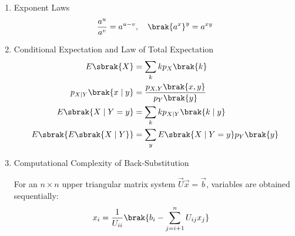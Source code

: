\begin{enumerate}[label=\thesubsection.\arabic*, ref=\thesubsection.\theenumi]
	\item Exponent Laws
	\begin{align}
		\frac{a^{u}}{a^{v}} = a^{u-v}, \quad \brak{a^x}^y = a^{xy} \label{eq:DA2025-exponent}
	\end{align}
	
	\item Conditional Expectation and Law of Total Expectation
	\begin{align}
		E\sbrak{X} &= \sum_{k} k p_X\brak{k} \label{eq:DA2025-expectation}
		\\
		p_{X \mid Y}\brak{x \mid y} &= \frac{p_{X,Y}\brak{x, y}}{p_Y\brak{y}} \label{eq:DA2025-cond_pmf}
		\\
		E\sbrak{X \mid Y = y} &= \sum_{k} k p_{X \mid Y}\brak{k \mid y} \label{eq:DA2025-cond_expectation}
		\\
		E\sbrak{E\sbrak{X \mid Y}} &= \sum_{y} E\sbrak{X \mid Y = y} p_Y\brak{y} \label{eq:DA2025-total_expectation}
	\end{align}
	
	\item Computational Complexity of Back-Substitution
	
	For an $n \times n$ upper triangular matrix system $\vec{U}\vec{x} = \vec{b}$, variables are obtained sequentially:
	\begin{align}
		x_i &= \frac{1}{U_{ii}}\brak{b_i - \sum_{j=i+1}^n U_{ij} x_j} \label{eq:DA2025-back_sub}
	\end{align}
	

\end{enumerate}
